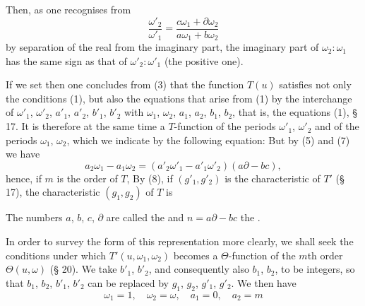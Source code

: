 Then, as one recognises from
\[
\frac{\omega'_2}{\omega'_1} = \frac{c\omega_1+\partial\omega_2}{a\omega_1+b\omega_2}
\]
by separation of the real from the imaginary part, the
imaginary part of $\omega_2:\omega_1$ has the same sign as that of
$\omega'_2:\omega'_1$ (the positive one).

If we set
then one concludes from (3) that the function $T(u)$ satisfies not only
the conditions (1), but also the equations that arise from (1) by the
interchange of $\omega'_1$, $\omega'_2$, $a'_1$, $a'_2$, $b'_1$, $b'_2$ with $\omega_1$, $\omega_2$, $a_1$, $a_2$, $b_1$, $b_2$,
that is, the equations (1), § 17. It is
therefore at the same time a $T$-function of the periods $\omega'_1$, $\omega'_2$ and of the
periods $\omega_1$, $\omega_2$, which we indicate by the following equation:
But by (5) and (7) we have
\[
a_2\omega_1 - a_1\omega_2 = (a'_2\omega'_1 - a'_1\omega'_2)(a\partial - bc),
\]
hence, if $m$ is the order of $T$,
By (8), if $(g'_1, g'_2)$ is the characteristic of $T'$ (§ 17), the
characteristic $(g_1, g_2)$ of $T$ is

The numbers $a$, $b$, $c$, $\partial$ are called the 
and $n = a\partial - bc$ the .

In order to survey the form of this representation more clearly,
we shall seek the conditions under which $T'(u, \omega_1, \omega_2)$
becomes a $\Theta$-function of the $m$th order $\Theta(u,\omega)$ (§ 20). We
take $b'_1$, $b'_2$, and consequently also $b_1$, $b_2$, to be integers, so that
$b_1$, $b_2$, $b'_1$, $b'_2$ can be replaced by $g_1$, $g_2$, $g'_1$, $g'_2$. We
then have
\[
\omega_1 = 1, \quad \omega_2 = \omega, \quad a_1 = 0, \quad a_2 = m
\]
